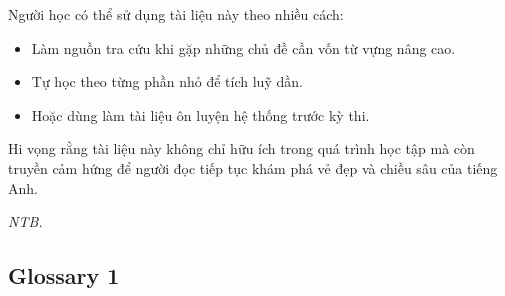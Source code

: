 \documentclass[a4paper,12pt]{article}
\begin{document}
\vspace{3mm}
\noindent
Người học có thể sử dụng tài liệu này theo nhiều cách: 

\begin{itemize}
    \item Làm nguồn tra cứu khi gặp những chủ đề cần vốn từ vựng nâng cao.
    \item Tự học theo từng phần nhỏ để tích luỹ dần.
    \item Hoặc dùng làm tài liệu ôn luyện hệ thống trước kỳ thi.
\end{itemize}
 

\vspace{3mm}
\noindent
Hi vọng rằng tài liệu này không chỉ hữu ích trong quá trình 
học tập mà còn truyền cảm hứng để người đọc tiếp tục khám phá vẻ đẹp 
và chiều sâu của tiếng Anh.

\begin{flushright}
    {\emph{NTB.}}
\end{flushright}

\newpage
\begin{multicols}{2}

\section*{Glossary 1}

\lipsum[1-10]


\end{multicols}
\end{document}
